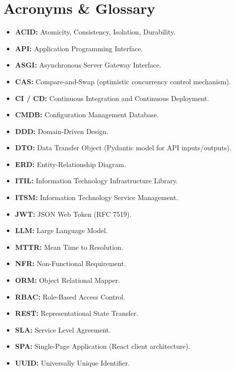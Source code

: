 \documentclass[11pt,a4paper,oneside]{report}
\begin{document}
\chapter{Acronyms \& Glossary}
\label{app:glossary}
\begin{itemize}
    \item \textbf{ACID:} Atomicity, Consistency, Isolation, Durability.
    \item \textbf{API:} Application Programming Interface.
    \item \textbf{ASGI:} Asynchronous Server Gateway Interface.
    \item \textbf{CAS:} Compare-and-Swap (optimistic concurrency control mechanism).
    \item \textbf{CI / CD:} Continuous Integration and Continuous Deployment.
    \item \textbf{CMDB:} Configuration Management Database.
    \item \textbf{DDD:} Domain-Driven Design.
    \item \textbf{DTO:} Data Transfer Object (Pydantic model for API inputs/outputs).
    \item \textbf{ERD:} Entity-Relationship Diagram.
    \item \textbf{ITIL:} Information Technology Infrastructure Library.
    \item \textbf{ITSM:} Information Technology Service Management.
    \item \textbf{JWT:} JSON Web Token (RFC 7519).
    \item \textbf{LLM:} Large Language Model.
    \item \textbf{MTTR:} Mean Time to Resolution.
    \item \textbf{NFR:} Non-Functional Requirement.
    \item \textbf{ORM:} Object Relational Mapper.
    \item \textbf{RBAC:} Role-Based Access Control.
    \item \textbf{REST:} Representational State Transfer.
    \item \textbf{SLA:} Service Level Agreement.
    \item \textbf{SPA:} Single-Page Application (React client architecture).
    \item \textbf{UUID:} Universally Unique Identifier.
\end{itemize}
\end{document}
